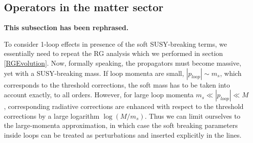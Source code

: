 \documentclass[12pt]{revtex4}
\begin{document}







\subsection{Operators in the matter sector}

	{\bf This subsection has been rephrased.}

	To consider 1-loop effects in presence of the soft SUSY-breaking terms, 
	we essentially need to repeat the RG analysis which we performed in
	section \ref{RGEvolution}.
	Now, formally speaking, the propagators must become massive, yet with a SUSY-breaking
	mass. 
	If loop momenta are small, $|p_{loop}| \sim m_{s}$, which corresponds to the 
	threshold corrections,
 	the soft mass has to be taken into account exactly, to all orders.
	However, for large loop momenta
$ m_{s} \ll |p_{loop}|\ll M $,
	corresponding radiative corrections 
	are enhanced with respect to the threshold corrections by a large logarithm
$\log(M/m_{s})$.
	Thus we can limit ourselves to the large-momenta approximation, in which case
	the soft breaking parameters inside loops can be treated as perturbations
	and inserted explicitly in the lines.
\end{document}
